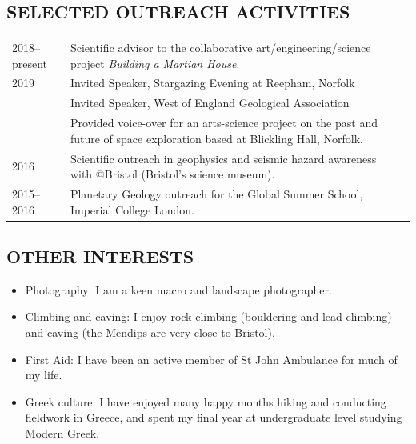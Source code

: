 \documentclass[11pt,twoside,a4paper]{article}
\begin{document}
\vspace{-1.5em}

\clearpage
\subsection*{SELECTED OUTREACH ACTIVITIES}

\vspace{-0.5em}
\begin{table}[!h]
\centering
\begin{tabular}{L{2cm} L{13cm} L{2cm}}
  2018--present \vfill & Scientific advisor to the collaborative art/engineering/science project \emph{Building a Martian House}. & \\
  2019  & Invited Speaker, Stargazing Evening at Reepham, Norfolk \\
  & Invited Speaker, West of England Geological Association \\
   \vfill & Provided voice-over for an arts-science project on the past and future of space exploration based at Blickling Hall, Norfolk. & \\
  2016 \vfill & Scientific outreach in geophysics and seismic hazard awareness with @Bristol (Bristol's science museum). & \\
  2015--2016 \vfill & Planetary Geology outreach for the Global Summer School, Imperial College London. &
\end{tabular}
\end{table}
\vspace{-1.5em}

\subsection*{OTHER INTERESTS}
\begin{itemize}
\item Photography: I am a keen macro and landscape photographer.
\item Climbing and caving: I enjoy rock climbing (bouldering and lead-climbing) and caving (the Mendips are very close to Bristol).
\item First Aid: I have been an active member of St John Ambulance for much of my life.
\item Greek culture: I have enjoyed many happy months hiking and conducting fieldwork in Greece, and spent my final year at undergraduate level studying Modern Greek.
\end{itemize}
\end{document}
